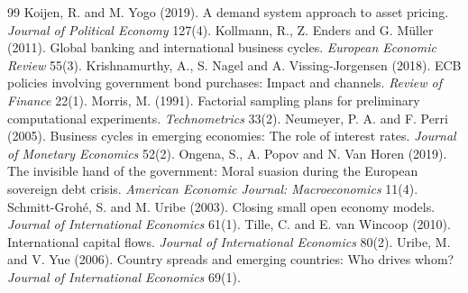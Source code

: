 \documentclass[11pt]{article}
\begin{document}
\begin{thebibliography}{99}
 Koijen, R. and M. Yogo (2019). A demand system approach to asset pricing. \emph{Journal of Political Economy} 127(4).
 Kollmann, R., Z. Enders and G. M\"uller (2011). Global banking and international business cycles. \emph{European Economic Review} 55(3).
 Krishnamurthy, A., S. Nagel and A. Vissing-Jorgensen (2018). ECB policies involving government bond purchases: Impact and channels. \emph{Review of Finance} 22(1).
 Morris, M. (1991). Factorial sampling plans for preliminary computational experiments. \emph{Technometrics} 33(2).
 Neumeyer, P. A. and F. Perri (2005). Business cycles in emerging economies: The role of interest rates. \emph{Journal of Monetary Economics} 52(2).
 Ongena, S., A. Popov and N. Van Horen (2019). The invisible hand of the government: Moral suasion during the European sovereign debt crisis. \emph{American Economic Journal: Macroeconomics} 11(4).
 Schmitt-Groh\'e, S. and M. Uribe (2003). Closing small open economy models. \emph{Journal of International Economics} 61(1).
 Tille, C. and E. van Wincoop (2010). International capital flows. \emph{Journal of International Economics} 80(2).
 Uribe, M. and V. Yue (2006). Country spreads and emerging countries: Who drives whom? \emph{Journal of International Economics} 69(1).
\end{thebibliography}
\end{document}
